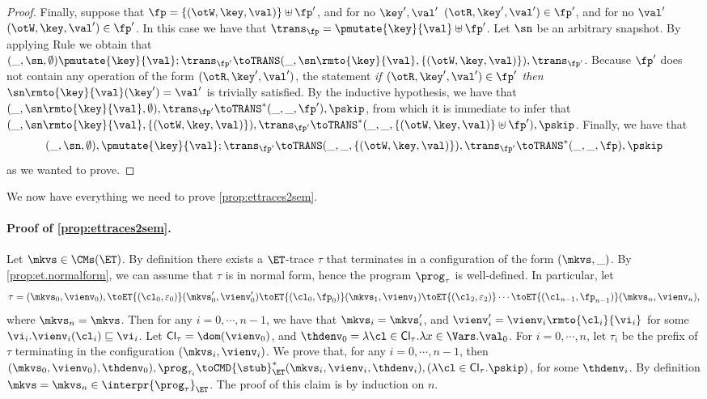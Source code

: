 \begin{proof}
Finally, suppose that $\fp = \{(\otW, \key, \val)\} \uplus \fp'$, and 
for no  $\key', \val'$ $(\otR,\key', \val') \in \fp'$, and for no $\val'$ 
$(\otW, \key, \val') \in \fp'$. In this case we have that $\trans_{\fp} = 
\pmutate{\key}{\val} \uplus \fp'$. Let $\sn$ be an arbitrary snapshot. 
By applying Rule  we obtain that $(\_, \sn, \emptyset) \pmutate{\key}{\val} ; \trans_{\fp'} 
\toTRANS (\_, \sn\rmto{\key}{\val}, \{(\otW, \key, \val)\}), \trans_{\fp'}$. Because $\fp'$ does not contain 
any operation of the form $(\otR, \key', \val')$, the statement \emph{if $(\otR,\key',\val') \in \fp'$ then 
$\sn\rmto{\key}{\val}(\key') = \val'$} is trivially satisfied. By the inductive hypothesis, we have that 
$(\_, \sn\rmto{\key}{\val}, \emptyset), \trans_{\fp'} \toTRANS^{\ast} (\_, \_, \fp'), \pskip$, 
from which it is immediate to infer that 
$(\_, \sn\rmto{\key}{\val}, \{(\otW, \key, \val)\}), \trans_{\fp'} \toTRANS^{\ast} (\_, \_, \{(\otW, \key, \val)\} \uplus \fp'), \pskip$. 
Finally, we have that 
\[
(\_, \sn, \emptyset), \pmutate{\key}{\val} ; \trans_{\fp'} \toTRANS (\_, \_, \{(\otW, \key, \val)\}), \trans_{\fp'} \toTRANS^{\ast} (\_, \_, \fp), \pskip
\]
as we wanted to prove.
\end{proof}

We now have everything we need to prove \cref{prop:ettraces2sem}.
\paragraph{Proof of \cref{prop:ettraces2sem}.}
Let $\mkvs \in \CMs(\ET)$. By definition there exists a $\ET$-trace $\tau$ that 
terminates in a configuration of the form $(\mkvs, \_)$. By \cref{prop:et.normalform}, we 
can assume that $\tau$ is in normal form, hence the program $\prog_{\tau}$ is well-defined. 
In particular, let 
\[
\tau = (\mkvs_{0}, \vienv_{0}), \toET{(\cl_{0}, \varepsilon_{0})} (\mkvs_{0}', \vienv_{0}') \toET{(\cl_{0}, \fp_{0})} (\mkvs_{1}, \vienv_{1}) 
\toET{(\cl_{2}, \varepsilon_{2})} \cdots \toET{(\cl_{n-1}, \fp_{n-1})} (\mkvs_{n}, \vienv_{n}),
\]
where $\mkvs_{n} = \mkvs$. Then for any $i =0,\cdots, n-1$, we have that $\mkvs_{i} = \mkvs'_{i}$, 
and $\vienv'_{i} = \vienv_{i}\rmto{\cl_{i}}{\vi_{i}}$ for some $\vi_{i}. \vienv_{i}(\cl_{i}) \sqsubseteq \vi_{i}$.
Let $\mathsf{Cl}_{\tau} = \dom(\vienv_{0})$, and $\thdenv_{0} = \lambda \cl \in \mathsf{Cl}_{\tau}. \lambda x \in \Vars. \val_{0}$. 
For $i=0,\cdots, n$, let $\tau_{i}$ be the prefix of $\tau$ terminating in the configuration $(\mkvs_{i}, \vienv_{i})$.
We prove that, for any $i=0,\cdots, n-1$, 
then $(\mkvs_{0}, \vienv_{0}), \thdenv_{0}), \prog_{\tau_{i}} \toCMD{\stub}^{\ast}_{\ET} (\mkvs_{i}, \vienv_{i}, \thdenv_{i}), (\lambda \cl \in \mathsf{Cl}_{\tau}.\pskip)$, 
for some $\thdenv_{i}$. By definition $\mkvs = \mkvs_{n} \in \interpr{\prog_{\tau}}_{\ET}$. 
The proof of this claim is by induction on $n$.

